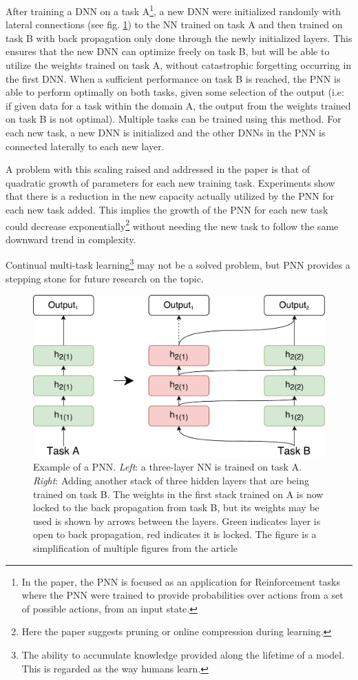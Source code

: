 \documentclass[a4paper,english]{report}
\begin{document}
After training a DNN on a task A\footnote{In the paper, the PNN is focused as an application for Reinforcement tasks where the PNN were trained to provide probabilities over actions from a set of possible actions, from an input state.}, a new DNN were initialized randomly with lateral connections (see fig. \ref{fig:pnn}) to the NN trained on task A and then trained on task B with back propagation only done through the newly initialized layers. This ensures that the new DNN can optimize freely on task B, but will be able to utilize the weights trained on task A, without catastrophic forgetting occurring in the first DNN. When a sufficient performance on task B is reached, the PNN is able to perform optimally on both tasks, given some selection of the output (i.e: if given data for a task within the domain A, the output from the weights trained on task B is not optimal). Multiple tasks can be trained using this method. For each new task, a new DNN is initialized and the other DNNs in the PNN is connected laterally to each new layer. 

A problem with this scaling raised and addressed in the paper is that of quadratic growth of parameters for each new training task. Experiments show that there is a reduction in the new capacity actually utilized by the PNN for each new task added. This implies the growth of the PNN for each new task could decrease exponentially\footnote{Here the paper suggests pruning or online compression during learning.} without needing the new task to follow the same downward trend in complexity. 

Continual multi-task learning\footnote{The ability to accumulate knowledge provided along the lifetime of a model. This is regarded as the way humans learn.} may not be a solved problem, but PNN provides a stepping stone for future research on the topic. 
\begin{figure}[t]
    \includegraphics[width=\textwidth]{figures/ProgressiveNeuralNet.pdf}
    \caption{Example of a PNN. \textit{Left}: a three-layer NN is trained on task A. \textit{Right}: Adding another stack of three hidden layers that are being trained on task B. The weights in the first stack trained on A is now locked to the back propagation from task B, but its weights may be used is shown by arrows between the layers. Green indicates layer is open to back propagation, red indicates it is locked. The figure is a simplification of multiple figures from the article\cite{progressiveneuralnetworks}}
    \label{fig:pnn}
\end{figure}
\end{document}
